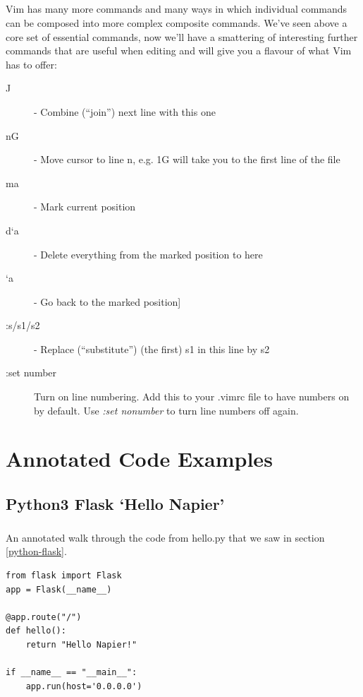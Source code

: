 \documentclass[12pt, a4paper, oneside]{book}
\begin{document}
{\paragraph{} Vim has many more commands and many ways in which individual commands can be composed into more complex composite commands. We've seen above a core set of essential commands, now we'll have a smattering of interesting further commands that are useful when editing and will give you a flavour of what Vim has to offer:
\begin{description}
\item[J] - Combine (``join'') next line with this one
\item[nG] - Move cursor to line n, e.g. 1G will take you to the first line of the file
\item[ma] - Mark current position
\item[d`a] - Delete everything from the marked position to here
\item[`a] -  Go back to the marked position] 
\item[:s/s1/s2] - Replace (``substitute'') (the first) s1 in this line by s2
\item[:set number] Turn on line numbering.  Add this to your .vimrc file to have numbers on by default. Use \emph{:set nonumber} to turn line numbers off again.
\end{description}


\chapter{Annotated Code Examples}
\label{annotated}

\section{Python3 Flask `Hello Napier'}
\label{annotated_hello_napier}
\paragraph{} An annotated walk through the code from hello.py that we saw in section \ref{python-flask}.

\begin{lstlisting}
from flask import Flask 
app = Flask(__name__)

@app.route("/")
def hello():
    return "Hello Napier!"

if __name__ == "__main__":
    app.run(host='0.0.0.0')

\end{lstlisting}

}
\end{document}
